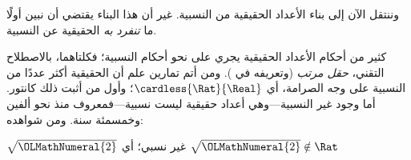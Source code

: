 \documentclass[../../../include/open-logic-section]{subfiles}
\begin{document}

وننتقل الآن إلى بناء الأعداد الحقيقية من النسبية. غير أن هذا البناء يقتضي أن نبين أولًا ما \emph{تنفرد به} الحقيقية عن النسبية.

كثير من أحكام الأعداد الحقيقية يجري على نحو أحكام النسبية؛ فكلتاهما، بالاصطلاح التقني، \emph{حقل مرتب} (وتعريفه في ). ومن أتم تمارين  علم أن الحقيقية أكثر عددًا من النسبية على وجه الصرامة، أي $\cardless{\Rat}{\Real}$؛ وأول من أثبت ذلك كانتور. أما وجود غير النسبية---وهي أعداد حقيقية ليست نسبية---فمعروف منذ نحو ألفين وخمسمئة سنة. ومن شواهده:
\begin{thm}
$\sqrt{{\OLMathNumeral{2}}}$ غير نسبي؛ أي $\sqrt{{\OLMathNumeral{2}}} \notin \Rat$
\end{thm}
\end{document}
